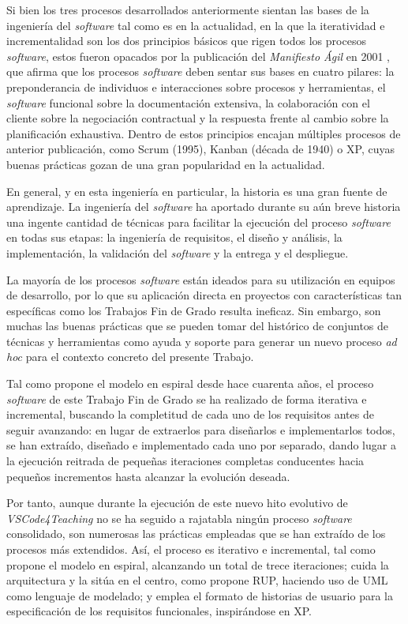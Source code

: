 Si bien los tres procesos desarrollados anteriormente sientan las bases de la ingeniería del \textit{software} tal como es en la actualidad, en la que la iteratividad e incrementalidad son los dos principios básicos que rigen todos los procesos \textit{software}, estos fueron opacados por la publicación del \textit{Manifiesto Ágil} en 2001 \cite{AgileManifesto}, que afirma que los procesos \textit{software} deben sentar sus bases en cuatro pilares: la preponderancia de individuos e interacciones sobre procesos y herramientas, el \textit{software} funcional sobre la documentación extensiva, la colaboración con el cliente sobre la negociación contractual y la respuesta frente al cambio sobre la planificación exhaustiva. Dentro de estos principios encajan múltiples procesos de anterior publicación, como Scrum (1995), Kanban (década de 1940) o XP, cuyas buenas prácticas gozan de una gran popularidad en la actualidad.

En general, y en esta ingeniería en particular, la historia es una gran fuente de aprendizaje. La ingeniería del \textit{software} ha aportado durante su aún breve historia una ingente cantidad de técnicas para facilitar la ejecución del proceso \textit{software} en todas sus etapas: la ingeniería de requisitos, el diseño y análisis, la implementación, la validación del \textit{software} y la entrega y el despliegue.

La mayoría de los procesos \textit{software} están ideados para su utilización en equipos de desarrollo, por lo que su aplicación directa en proyectos con características tan específicas como los Trabajos Fin de Grado resulta ineficaz. Sin embargo, son muchas las buenas prácticas que se pueden tomar del histórico de conjuntos de técnicas y herramientas como ayuda y soporte para generar un nuevo proceso \textit{ad hoc} para el contexto concreto del presente Trabajo.

Tal como propone el modelo en espiral desde hace cuarenta años, el proceso \textit{software} de este Trabajo Fin de Grado se ha realizado de forma iterativa e incremental, buscando la completitud de cada uno de los requisitos antes de seguir avanzando: en lugar de extraerlos para diseñarlos e implementarlos todos, se han extraído, diseñado e implementado cada uno por separado, dando lugar a la ejecución reitrada de pequeñas iteraciones completas conducentes hacia pequeños incrementos hasta alcanzar la evolución deseada.

Por tanto, aunque durante la ejecución de este nuevo hito evolutivo de \textit{VSCode4Teaching} no se ha seguido a rajatabla ningún proceso \textit{software} consolidado, son numerosas las prácticas empleadas que se han extraído de los procesos más extendidos. Así, el proceso es iterativo e incremental, tal como propone el modelo en espiral, alcanzando un total de trece iteraciones; cuida la arquitectura y la sitúa en el centro, como propone RUP, haciendo uso de UML como lenguaje de modelado; y emplea el formato de historias de usuario para la especificación de los requisitos funcionales, inspirándose en XP.

